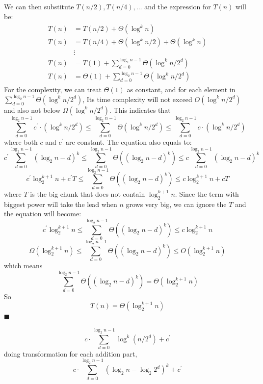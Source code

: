\documentclass{article}
\begin{document}
We can then substitute $T(n/2), T(n/4) ,\dots$ and the expression for $T(n)$ will be:
\begin{align}
  \begin{split}
    T(n) &= T(n/2) + \Theta(\log^k n) \\
    T(n) &= T(n/4) + \Theta(\log^k n/2) + \Theta(\log^k n) \\ \nonumber
      &\vdots \\ \nonumber
    T(n) &= T(1) + \sum^{\log_2 n - 1}_{d=0} \Theta(\log^k n/2^d) \\ \nonumber
    T(n) &= \Theta(1) +\sum^{\log_2 n - 1}_{d=0} \Theta(\log^k n/2^d) \nonumber
  \end{split}
\end{align}
For the complexity, we can treat $\Theta(1)$ as constant, and for each element in $\sum^{\log_2 n - 1}_{d=0} \Theta(\log^k n/2^d)$,
Its time complexity will not exceed $O(\log^k n/2^d)$ and also not below $\Omega(\log^k n/2^d)$. This indicates that 
$$\sum^{\log_2 n - 1}_{d=0} c^\prime \cdot (\log^k n/2^d) \leq \sum^{\log_2 n - 1}_{d=0} \Theta(\log^k n/2^d) \leq \sum^{\log_2 n - 1}_{d=0} c \cdot (\log^k n/2^d) $$
where both $c$ and $c^\prime$ are constant. The equation also equals to:
$$c^\prime \sum^{\log_2 n -1}_{d=0}(\log_2 n - d)^k \leq \sum^{\log_2 n - 1}_{d=0} \Theta((\log_2 n - d)^k) \leq c \sum^{\log_2 n -1}_{d=0}(\log_2 n - d)^k$$
$$c^\prime \log_2^{k+1} n + c^\prime T \leq \sum^{\log_2 n - 1}_{d=0} \Theta((\log_2 n - d)^k) \leq c \log_2^{k+1} n + cT $$
where $T$ is the big chunk that does not contain $\log_2^{k+1} n$. Since the term with
biggest power will take the lead when $n$ grows very big, we can ignore the $T$ and the equation will become:
$$c^\prime \log_2^{k+1} n \leq \sum^{\log_2 n - 1}_{d=0} \Theta((\log_2 n - d)^k) \leq c \log_2^{k+1} n$$
$$\Omega(\log_2^{k+1} n) \leq \sum^{\log_2 n - 1}_{d=0} \Theta((\log_2 n - d)^k)  \leq O(\log_2^{k+1} n)$$
which means
$$\sum^{\log_2 n - 1}_{d=0} \Theta((\log_2 n - d)^k) = \Theta(\log_2^{k+1} n)$$
So
$$T(n) = \Theta(\log_2^{k+1} n)$$
$\blacksquare$



















$$c \cdot \sum^{\log_2 n -1}_{d=0}\log^k (n/2^d) + c^\prime $$
doing transformation for each addition part,
$$c \cdot \sum^{\log_2 n -1}_{d=0}(\log_2 n - \log_2 2^d)^k + c^\prime $$
\end{document}
